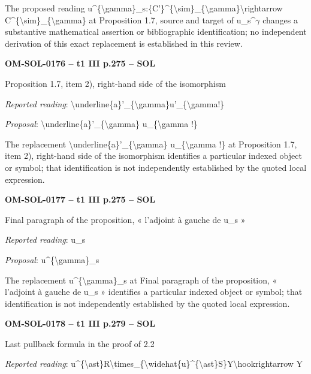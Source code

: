The proposed reading u\textasciicircum{}\{\textbackslash{}gamma\}\_s:\{C'\}\textasciicircum{}\{\textbackslash{}sim\}\_\{\textbackslash{}gamma\}\textbackslash{}rightarrow C\textasciicircum{}\{\textbackslash{}sim\}\_\{\textbackslash{}gamma\} at Proposition 1.7, source and target of u\_s\textasciicircum{}\ensuremath{\gamma} changes a substantive mathematical assertion or bibliographic identification; no independent derivation of this exact replacement is established in this review.\par
\par\noindent\textbf{OM-SOL-0176 -- t1 III p.275 -- SOL}\par
Proposition 1.7, item 2), right-hand side of the isomorphism\par
\emph{Reported reading}: \textbackslash{}underline\{a\}'\_\{\textbackslash{}gamma\}u'\_\{\textbackslash{}gamma!\}\par
\emph{Proposal}: \textbackslash{}underline\{a\}'\_\{\textbackslash{}gamma\} u\_\{\textbackslash{}gamma !\}\par
The replacement \textbackslash{}underline\{a\}'\_\{\textbackslash{}gamma\} u\_\{\textbackslash{}gamma !\} at Proposition 1.7, item 2), right-hand side of the isomorphism identifies a particular indexed object or symbol; that identification is not independently established by the quoted local expression.\par
\par\noindent\textbf{OM-SOL-0177 -- t1 III p.275 -- SOL}\par
Final paragraph of the proposition, « l'adjoint à gauche de u\_s »\par
\emph{Reported reading}: u\_s\par
\emph{Proposal}: u\textasciicircum{}\{\textbackslash{}gamma\}\_s\par
The replacement u\textasciicircum{}\{\textbackslash{}gamma\}\_s at Final paragraph of the proposition, « l'adjoint à gauche de u\_s » identifies a particular indexed object or symbol; that identification is not independently established by the quoted local expression.\par
\par\noindent\textbf{OM-SOL-0178 -- t1 III p.279 -- SOL}\par
Last pullback formula in the proof of 2.2\par
\emph{Reported reading}: u\textasciicircum{}\{\textbackslash{}ast\}R\textbackslash{}times\_\{\textbackslash{}widehat\{u\}\textasciicircum{}\{\textbackslash{}ast\}S\}Y\textbackslash{}hookrightarrow Y\par
